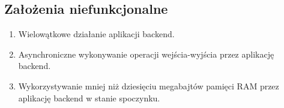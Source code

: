 \subsection{Założenia niefunkcjonalne}

\begin{enumerate}

    \item Wielowątkowe działanie aplikacji backend.

    \item Asynchroniczne wykonywanie operacji wejścia-wyjścia przez aplikację
        backend.

    \item Wykorzystywanie mniej niż dziesięciu megabajtów pamięci RAM przez
        aplikację backend w stanie spoczynku.

\end{enumerate}
